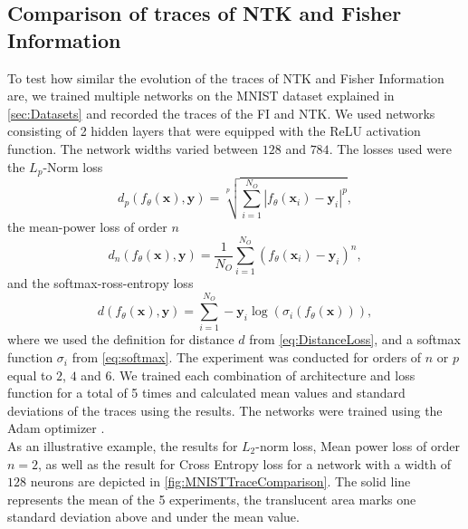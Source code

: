 \subsection{Comparison of traces of NTK and Fisher Information}\label{sec:TraceComparisonExperiment}
To test how similar the evolution of the traces of NTK and Fisher Information are, we trained multiple networks on the MNIST dataset explained in \cref{sec:Datasets} and recorded the traces of the FI and NTK. We used networks consisting of 2 hidden layers that were equipped with the ReLU activation function. The network widths varied between $128$ and $784$. The losses used were the $L_p$-Norm loss \cite{LpNormSource}
\begin{equation}
	d_p(f_\theta(\mathbf{x}),\mathbf{y}) = \sqrt[p]{\sum_{i=1}^{N_O} |f_\theta(\mathbf{x}_i) - \mathbf{y}_i|^p},
\end{equation}
the mean-power loss of order $n$
\begin{equation}
	d_n(f_\theta(\mathbf{x}),\mathbf{y}) = \frac{1}{N_O} \sum_{i=1}^{N_O} (f_\theta(\mathbf{x}_i)-\mathbf{y}_i)^n,
\end{equation}
and the softmax-ross-entropy loss \cite{LossExamplePaper}
\begin{equation}
	d(f_\theta(\mathbf{x}),\mathbf{y}) = \sum_{i=1}^{N_O} -\mathbf{y}_i \log(\sigma_i(f_\theta(\mathbf{x}))),
\end{equation}
where we used the definition for distance $d$ from \cref{eq:DistanceLoss}, and a softmax function $\sigma_i$ from \cref{eq:softmax}. The experiment was conducted for orders of $n$ or $p$ equal to $2$, $4$ and $6$. We trained each combination of architecture and loss function for a total of 5 times and calculated mean values and standard deviations of the traces using the results. The networks were trained using the Adam optimizer \cite{adamPaper}.\\
As an illustrative example, the results for $L_2$-norm loss, Mean power loss of order $n=2$, as well as the result for Cross Entropy loss for a network with a width of $128$ neurons are depicted in \cref{fig:MNISTTraceComparison}. The solid line represents the mean of the 5 experiments, the translucent area marks one standard deviation above and under the mean value.\\
